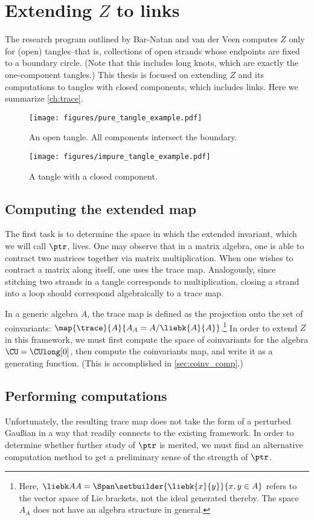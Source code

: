 \section{Extending $Z$ to links}
The research program outlined by Bar-Natan and van der Veen computes $Z$
only for (open) tangles--that is, collections of open strands whose endpoints
are fixed to a boundary circle. (Note that this includes long knots, which are
exactly the one-component tangles.) This thesis is focused on extending $Z$ and
its computations to tangles with closed components, which includes links. Here
we summarize \cref{ch:trace}.
\begin{figure}[h]
        \centering
        \texttt{[image: figures/pure\_tangle\_example.pdf]}
        \caption{An open tangle. All components intersect the boundary.}
        \label{fig:open_tangle}
\end{figure}
\begin{figure}[h]
        \centering
        \texttt{[image: figures/impure\_tangle\_example.pdf]}
        \caption{A tangle with a closed component.}
        \label{fig:impure_tangle}
\end{figure}        

\subsection{Computing the extended map}
The first task is to determine the space in which the extended invariant, which
we will call $\ptr$, lives. One may observe that in a matrix algebra, one is
able to contract two matrices together via matrix multiplication. When one
wishes to contract a matrix along itself, one uses the trace map. Analogously,
since stitching two strands in a tangle corresponds to multiplication, closing a
strand into a loop should correspond algebraically to a trace map.

In a generic algebra $A$, the trace map is defined as the projection onto the
set of coinvariants: $\map {\trace} {A} {A_A = A/\liebk{A}{A}}$.\footnote{Here,
$\liebk AA = \Span\setbuilder{\liebk{x}{y}}{x, y\in A}$ refers to the vector
space of Lie brackets, not the ideal generated thereby. The space $A_A$ does not
have an algebra structure in general.} In order to extend $Z$ in this framework,
we must first compute the space of coinvariants for the algebra $\CU =
\CUlong[0]$, then compute the coinvariants map, and write it as a generating
function. (This is accomplished in \cref{sec:coinv_comp}.)

\subsection{Performing computations}
Unfortunately, the resulting trace map does not take the form of a perturbed
Gaußian in a way that readily connects to the existing framework. In order to
determine whether further study of $\ptr$ is merited, we must find an
alternative computation method to get a preliminary sense of the strength of
$\ptr$.

